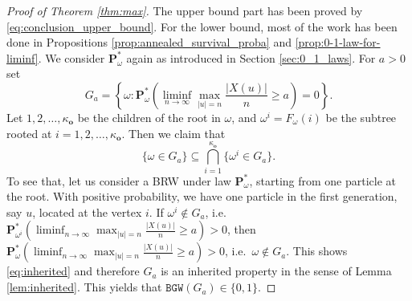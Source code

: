 \documentclass[11 pt]{article}
\theoremstyle{definition}
\numberwithin{equation}{section}
\newcommand{\rt}{\mathbf{o}} %
\newcommand{\Pwo}{\mathbf{P}_{\omega}^*} %
\begin{document}
\begin{proof}[Proof of Theorem \ref{thm:max}]
The upper bound part has been proved by \eqref{eq:conclusion_upper_bound}. 
	For the lower bound, most of the work has been done in Propositions 
	\ref{prop:annealed_survival_proba} and \ref{prop:0-1-law-for-liminf}. We consider $\Pwo$ again 
	as introduced in Section \ref{sec:0_1_laws}. For $a>0$ set 
	\begin{equation*}	
		G_a = \left \{\omega\colon \Pwo \left( \liminf_{n \to \infty} \max_{|u|=n} \frac{\vert X(u) \vert }{n} \geq a \right)=0 \right\}.
	\end{equation*}
	Let $1,2,\ldots, \kappa_{\rt}$ be the children of the root in $\omega$, and $\omega^i=F_\omega(i)$ be the subtree rooted at $i = 1,2,\ldots, \kappa_{\rt}$. 
	Then we claim that
	\begin{equation}\label{eq:inherited}
	\{\omega\in G_a\} \subseteq \bigcap_{i=1}^{\kappa_{\rt}} \{\omega^i\in G_a\}.  
	\end{equation}
	To see that, let us consider a BRW under law $\mathbf{P}^*_{\omega}$, starting from one particle at the 
	root. With positive probability, we have one particle in the first generation, say $u$, located at the vertex $i$. 
	If $\omega^i\not\in G_a$, i.e.\ 
	$ \mathbf{P}_{\omega^i}^* (  \liminf_{n \to \infty} \max_{|u|=n} \frac{\vert X(u) \vert }{n} \geq a)>0$, then  
	$ \mathbf{P}_{\omega}^* ( \liminf_{n \to \infty} \max_{|u|=n} \frac{\vert X(u) \vert }{n} \geq a )>0$, 
	i.e.\ $\omega\not\in G_a$. This shows \eqref{eq:inherited} and therefore $G_a$ is an inherited property in the 
	sense of Lemma \ref{lem:inherited}. This  yields that $\mathtt{BGW}(G_a)\in \{0,1\}$. 


\end{proof}
\end{document}
